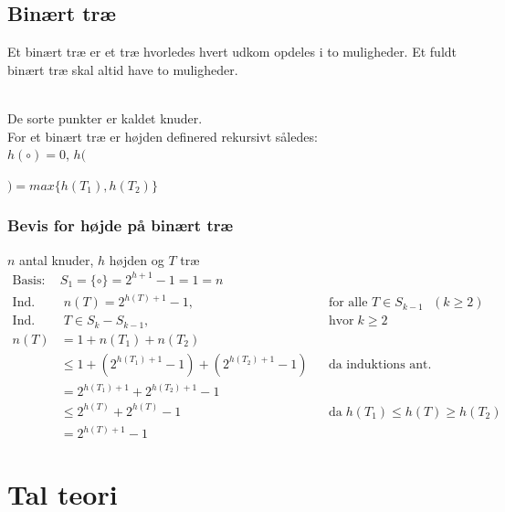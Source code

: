 \documentclass[12pt, a4paper]{article}
\begin{document}
				\subsection{Binært træ}
					Et binært træ er et træ hvorledes hvert udkom opdeles i to muligheder. Et fuldt binært træ skal altid have to muligheder.\\
					\\
					De sorte punkter er kaldet knuder.\\
					For et binært træ er højden definered rekursivt således: \\$h(\circ )=0$, $h($$)=max\{h(T_1),h(T_2)\}$\\
					\subsubsection{Bevis for højde på binært træ}
						$n$ antal knuder, $h$ højden og $T$ træ
						\begin{align*}
							\text{Basis:}\;& S_1=\{\circ\} = 2^{h+1}-1=1=n\\
							\text{Ind. ant:}&\;n(T)=2^{h(T)+1}-1, &&\text{for alle $T\in S_{k-1}$ $(k\geq2)$}\\
							\text{Ind. skridt:}&\; T\in S_k-S_{k-1}, &&\text{hvor}\; k\geq 2\\[4mm]
							n(T)&=1+n(T_1)+n(T_2)\\
							&\leq 1 + (2^{h(T_1)+1}-1)+(2^{h(T_2)+1}-1)&&\text{da induktions ant.}\\
							&=2^{h(T_1)+1}+2^{h(T_2)+1}-1\\
							&\leq 2^{h(T)}+2^{h(T)}-1 &&\text{da}\; h(T_1)\leq h(T) \geq h(T_2)\\
							&=2^{h(T)+1}-1
						\end{align*}
		\section{Tal teori}
\end{document}
